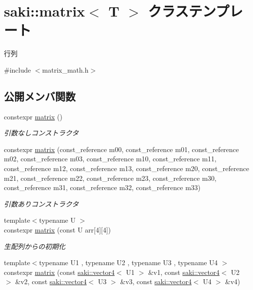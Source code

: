 \hypertarget{classsaki_1_1matrix}{}\section{saki\+:\+:matrix$<$ T $>$ クラステンプレート}
\label{classsaki_1_1matrix}


行列  




{\ttfamily \#include $<$matrix\+\_\+math.\+h$>$}

\subsection*{公開メンバ関数}
\begin{DoxyCompactItemize}
\item 
constexpr \mbox{\hyperlink{classsaki_1_1matrix_aca5102e0cdaedc779d668597d03baf10}{matrix}} ()
\begin{DoxyCompactList}\small\item\em 引数なしコンストラクタ \end{DoxyCompactList}\item 
constexpr \mbox{\hyperlink{classsaki_1_1matrix_a55edebaa14a4a0ea6b6f263ebe9950f4}{matrix}} (const\+\_\+reference m00, const\+\_\+reference m01, const\+\_\+reference m02, const\+\_\+reference m03, const\+\_\+reference m10, const\+\_\+reference m11, const\+\_\+reference m12, const\+\_\+reference m13, const\+\_\+reference m20, const\+\_\+reference m21, const\+\_\+reference m22, const\+\_\+reference m23, const\+\_\+reference m30, const\+\_\+reference m31, const\+\_\+reference m32, const\+\_\+reference m33)
\begin{DoxyCompactList}\small\item\em 引数ありコンストラクタ \end{DoxyCompactList}\item 
{\footnotesize template$<$typename U $>$ }\\constexpr \mbox{\hyperlink{classsaki_1_1matrix_aadbe6027fea1fecafc641cd553855408}{matrix}} (const U arr\mbox{[}4\mbox{]}\mbox{[}4\mbox{]})
\begin{DoxyCompactList}\small\item\em 生配列からの初期化 \end{DoxyCompactList}\item 
{\footnotesize template$<$typename U1 , typename U2 , typename U3 , typename U4 $>$ }\\constexpr \mbox{\hyperlink{classsaki_1_1matrix_a05256e26b2d44fe97a157c5bb510cdaf}{matrix}} (const \mbox{\hyperlink{classsaki_1_1vector4}{saki\+::vector4}}$<$ U1 $>$ \&v1, const \mbox{\hyperlink{classsaki_1_1vector4}{saki\+::vector4}}$<$ U2 $>$ \&v2, const \mbox{\hyperlink{classsaki_1_1vector4}{saki\+::vector4}}$<$ U3 $>$ \&v3, const \mbox{\hyperlink{classsaki_1_1vector4}{saki\+::vector4}}$<$ U4 $>$ \&v4)

\end{DoxyCompactItemize}
